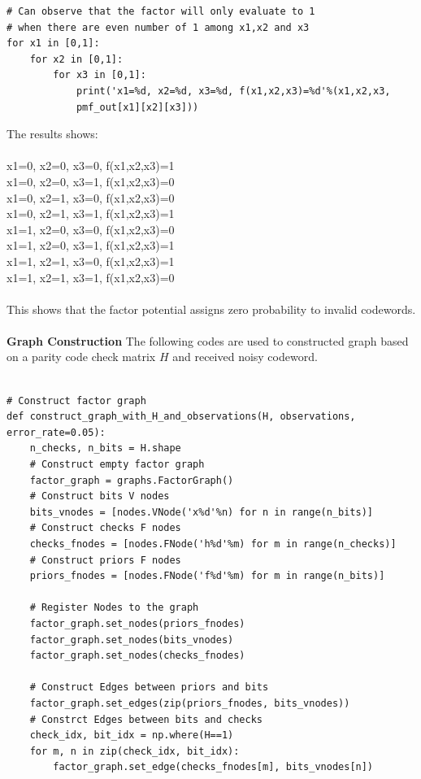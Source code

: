 \documentclass{article}
\begin{document}
\begin{enumerate}
\begin{enumerate}
\begin{verbatim}
# Can observe that the factor will only evaluate to 1 
# when there are even number of 1 among x1,x2 and x3
for x1 in [0,1]:
    for x2 in [0,1]:
        for x3 in [0,1]:
            print('x1=%d, x2=%d, x3=%d, f(x1,x2,x3)=%d'%(x1,x2,x3,
            pmf_out[x1][x2][x3]))
\end{verbatim}
The results shows:\\
\\
x1=0, x2=0, x3=0, f(x1,x2,x3)=1\\
x1=0, x2=0, x3=1, f(x1,x2,x3)=0\\
x1=0, x2=1, x3=0, f(x1,x2,x3)=0\\
x1=0, x2=1, x3=1, f(x1,x2,x3)=1\\
x1=1, x2=0, x3=0, f(x1,x2,x3)=0\\
x1=1, x2=0, x3=1, f(x1,x2,x3)=1\\
x1=1, x2=1, x3=0, f(x1,x2,x3)=1\\
x1=1, x2=1, x3=1, f(x1,x2,x3)=0\\
\\
This shows that the factor potential assigns zero probability to invalid codewords.\\\\
\textbf{Graph Construction}
The following codes are used to constructed graph based on a parity code check matrix $H$ and received noisy codeword.\\\\
\begin{verbatim}
# Construct factor graph
def construct_graph_with_H_and_observations(H, observations, error_rate=0.05):
    n_checks, n_bits = H.shape
    # Construct empty factor graph
    factor_graph = graphs.FactorGraph()
    # Construct bits V nodes
    bits_vnodes = [nodes.VNode('x%d'%n) for n in range(n_bits)]
    # Construct checks F nodes
    checks_fnodes = [nodes.FNode('h%d'%m) for m in range(n_checks)]
    # Construct priors F nodes
    priors_fnodes = [nodes.FNode('f%d'%m) for m in range(n_bits)]
    
    # Register Nodes to the graph
    factor_graph.set_nodes(priors_fnodes)
    factor_graph.set_nodes(bits_vnodes)
    factor_graph.set_nodes(checks_fnodes)
    
    # Construct Edges between priors and bits
    factor_graph.set_edges(zip(priors_fnodes, bits_vnodes))
    # Constrct Edges between bits and checks
    check_idx, bit_idx = np.where(H==1)
    for m, n in zip(check_idx, bit_idx):
        factor_graph.set_edge(checks_fnodes[m], bits_vnodes[n])
    

\end{verbatim}
\end{enumerate}
\end{enumerate}
\end{document}
